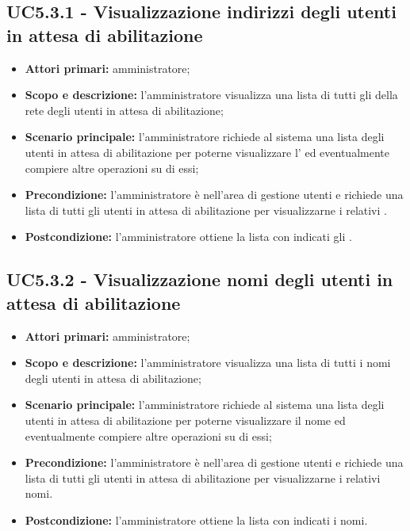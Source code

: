 \documentclass[AnalisiDeiRequisiti.tex]{subfiles}
\begin{document}
\subsection{UC5.3.1 - Visualizzazione indirizzi degli utenti in attesa di abilitazione}
\begin{itemize}
	\item \textbf{Attori primari:} amministratore;
	\item \textbf{Scopo e descrizione:} l'amministratore visualizza una lista di tutti gli  della rete  degli utenti in attesa di abilitazione;
	\item \textbf{Scenario principale:} l'amministratore richiede al sistema una lista degli utenti in attesa di abilitazione per poterne visualizzare l' ed eventualmente compiere altre operazioni su di essi;
	\item \textbf{Precondizione:} l'amministratore è nell'area di gestione utenti e richiede una lista di tutti gli utenti in attesa di abilitazione per visualizzarne i relativi .
	\item \textbf{Postcondizione:} l'amministratore ottiene la lista con indicati gli .
\end{itemize}
\subsection{UC5.3.2 - Visualizzazione nomi degli utenti in attesa di abilitazione}
\begin{itemize}
	\item \textbf{Attori primari:} amministratore;
	\item \textbf{Scopo e descrizione:} l'amministratore visualizza una lista di tutti i nomi degli utenti in attesa di abilitazione;
	\item \textbf{Scenario principale:} l'amministratore richiede al sistema una lista degli utenti in attesa di abilitazione per poterne visualizzare il nome ed eventualmente compiere altre operazioni su di essi;
	\item \textbf{Precondizione:} l'amministratore è nell'area di gestione utenti e richiede una lista di tutti gli utenti in attesa di abilitazione per visualizzarne i relativi nomi.
	\item \textbf{Postcondizione:} l'amministratore ottiene la lista con indicati i nomi.
\end{itemize}
\end{document}
